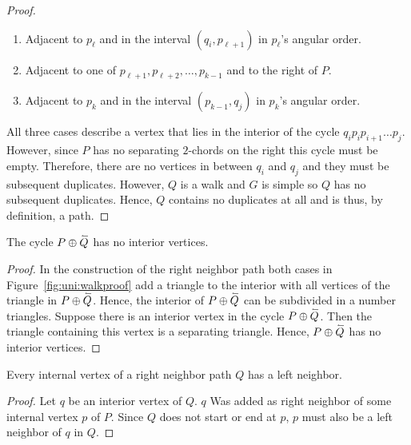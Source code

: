\begin{proof}
      \begin{enumerate}
        \item Adjacent to $p_\ell$ and in the interval $(q_i, p_{\ell+1})$ in $p_\ell$'s angular order.
        \item Adjacent to one of $p_{\ell+1},  p_{\ell+2},\ldots, p_{k-1}$ and to the right of $P$.
        \item Adjacent to $p_k$ and in the interval $(p_{k-1}, q_j)$ in $p_k$'s angular order.
      \end{enumerate}

      All three cases describe a vertex that lies in the interior of the cycle $q_i p_i p_{i+1} \ldots p_j$. However, since $P$ has no separating $2$-chords on the right this cycle must be empty. Therefore, there are no vertices in between $q_i$ and $q_j$ and they must be subsequent duplicates. However, $Q$ is a walk and $G$ is simple so $Q$ has no subsequent duplicates. Hence, $Q$ contains no duplicates at all and is thus, by definition, a path.
    \end{proof}

    \begin{lemma}
      \label{lm:right:neighbourwalkNoInteriorVertex}
      The cycle $P \oplus \accentset{\leftharpoonup}{Q}$ has no interior vertices.
    \end{lemma}

    \begin{proof}
      In the construction of the right neighbor path both cases in Figure~\ref{fig:uni:walkproof} add a triangle to the interior with all vertices of the triangle in $P \oplus \accentset{\leftharpoonup}{Q}$. Hence, the interior of $P \oplus \accentset{\leftharpoonup}{Q}$ can be subdivided in a number triangles.
      Suppose there is an interior vertex in the cycle $P \oplus \accentset{\leftharpoonup}{Q}$. Then the triangle containing this vertex is a separating triangle. Hence, $P \oplus \accentset{\leftharpoonup}{Q}$ has no interior vertices.
    \end{proof}

    \begin{lemma}
      \label{lm:right:leftNeighborsOfTheRightNeighborPath}
      Every internal vertex of a right neighbor path $Q$ has a left neighbor.
    \end{lemma}
    \begin{proof}
      Let $q$ be an interior vertex of $Q$.
      $q$ Was added as right neighbor of some internal vertex $p$ of $P$.
      Since $Q$ does not start or end at $p$, $p$ must also be a left neighbor of $q$ in $Q$.
    \end{proof}

